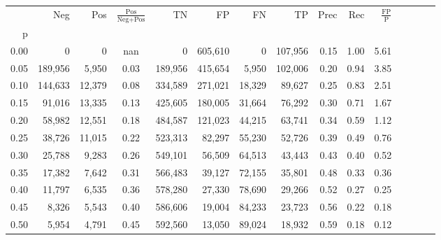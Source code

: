 \begin{tabular}{rrrcrrrrrrrrrrr}
\toprule
{} &      Neg &     Pos & $\frac{\text{Pos}}{\text{Neg}+\text{Pos}}$ &       TN &       FP &       FN &       TP &  Prec &   Rec & $\frac{\text{FP}}{\text{P}}$ \\
p    &          &         &                                            &          &          &          &          &       &       &                              \\
\midrule
0.00 &        0 &       0 &                                        nan &        0 &  605,610 &        0 &  107,956 &  0.15 &  1.00 &                         5.61 \\
0.05 &  189,956 &   5,950 &                                       0.03 &  189,956 &  415,654 &    5,950 &  102,006 &  0.20 &  0.94 &                         3.85 \\
0.10 &  144,633 &  12,379 &                                       0.08 &  334,589 &  271,021 &   18,329 &   89,627 &  0.25 &  0.83 &                         2.51 \\
0.15 &   91,016 &  13,335 &                                       0.13 &  425,605 &  180,005 &   31,664 &   76,292 &  0.30 &  0.71 &                         1.67 \\
0.20 &   58,982 &  12,551 &                                       0.18 &  484,587 &  121,023 &   44,215 &   63,741 &  0.34 &  0.59 &                         1.12 \\
0.25 &   38,726 &  11,015 &                                       0.22 &  523,313 &   82,297 &   55,230 &   52,726 &  0.39 &  0.49 &                         0.76 \\
0.30 &   25,788 &   9,283 &                                       0.26 &  549,101 &   56,509 &   64,513 &   43,443 &  0.43 &  0.40 &                         0.52 \\
0.35 &   17,382 &   7,642 &                                       0.31 &  566,483 &   39,127 &   72,155 &   35,801 &  0.48 &  0.33 &                         0.36 \\
0.40 &   11,797 &   6,535 &                                       0.36 &  578,280 &   27,330 &   78,690 &   29,266 &  0.52 &  0.27 &                         0.25 \\
0.45 &    8,326 &   5,543 &                                       0.40 &  586,606 &   19,004 &   84,233 &   23,723 &  0.56 &  0.22 &                         0.18 \\
0.50 &    5,954 &   4,791 &                                       0.45 &  592,560 &   13,050 &   89,024 &   18,932 &  0.59 &  0.18 &                         0.12 \\

\end{tabular}
